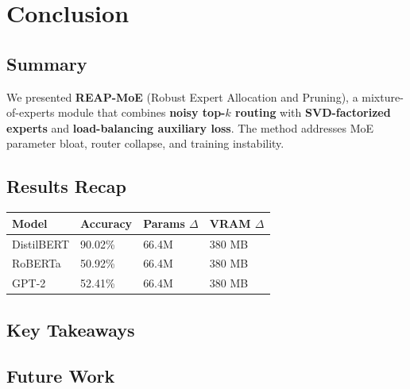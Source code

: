 \section{Conclusion}

\subsection{Summary}

We presented \textbf{REAP-MoE} (Robust Expert Allocation and Pruning), a 
mixture-of-experts module that combines \textbf{noisy top-$k$ routing} with 
\textbf{SVD-factorized experts} and \textbf{load-balancing auxiliary loss}. The method 
addresses MoE parameter bloat, router collapse, and training instability.

\subsection{Results Recap}

\begin{table}[H]
\centering
\small
\begin{tabular}{llll}
\toprule
\textbf{Model} & \textbf{Accuracy} & \textbf{Params $\Delta$} & \textbf{VRAM $\Delta$} \\
\midrule
DistilBERT & 90.02\% & 66.4M & 380 MB \\
RoBERTa & 50.92\% & 66.4M & 380 MB \\
GPT-2 & 52.41\% & 66.4M & 380 MB \\
\bottomrule
\end{tabular}
\end{table}

\subsection{Key Takeaways}

\subsection{Future Work}

